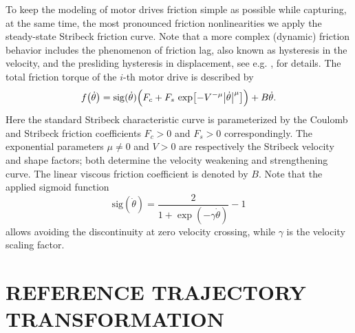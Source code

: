 \documentclass[a4paper, 10pt, conference]{ieeeconf}
\begin{document}
To keep the modeling of motor drives friction simple as possible
while capturing, at the same time, the most pronounced friction
nonlinearities we apply the steady-state Stribeck friction curve.
Note that a more complex (dynamic) friction behavior includes the
phenomenon of friction lag, also known as hysteresis in the
velocity, and the presliding hysteresis in displacement, see e.g.
\cite{ArmstDupontCan94}, \cite{AlBendSwev08} for details. The
total friction torque of the $i$-th motor
drive is described by
\begin{equation}\label{eq:f}
f\bigl(\dot{\theta}\bigr) = \mathrm{sig} (\dot{\theta})\Bigl(F_{c}
+ F_{s} \, \exp\bigl[ - V^{-\mu} \bigl|\dot{\theta}\bigr|^{\mu}
\bigr] \Bigr) + B \dot{\theta}.
\end{equation}
Here the standard Stribeck characteristic curve is parameterized
by the Coulomb and Stribeck friction coefficients $F_{c} > 0$ and
$F_{s} > 0$ correspondingly. The exponential parameters $\mu \neq
0$ and $V > 0$ are respectively the Stribeck velocity and shape
factors; both determine the velocity weakening and strengthening
curve. The linear viscous friction coefficient is denoted by $B$.
Note that the applied sigmoid function
\begin{equation}\label{g}
\mathrm{sig} (\dot{\theta}) = \frac{2}{1 + \exp(-\gamma
\dot{\theta})}-1
\end{equation}
allows avoiding the discontinuity at zero velocity crossing, while
$\gamma$ is the velocity scaling factor.




\section{REFERENCE TRAJECTORY TRANSFORMATION}
\label{sec:3}
\end{document}
